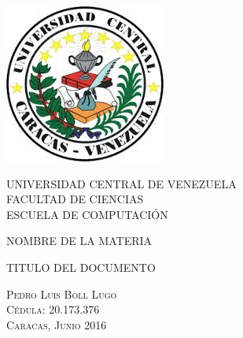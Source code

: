 \thispagestyle{empty}

\begin{minipage}[c][0.01\textheight][t]{0.95\textwidth}
\begin{center}

\includegraphics[scale=0.6]{./Figuras/ucv_logo.jpg}

\bigskip\bigskip\bigskip

{\centering \scshape \large
UNIVERSIDAD CENTRAL DE VENEZUELA \\
FACULTAD DE CIENCIAS \\
ESCUELA DE COMPUTACIÓN \\[38pt]}

\bigskip
{\centering\scshape\large
NOMBRE DE LA MATERIA\\
[38pt]}

\bigskip
{\scshape \LARGE 
TITULO DEL DOCUMENTO
\\[60pt]} 

{ \scshape \renewcommand\baselinestretch{2.0}\selectfont    
Pedro Luis Boll Lugo\\
Cédula: 20.173.376 \\[90pt]
Caracas, Junio 2016
}


\end{center}
\end{minipage}